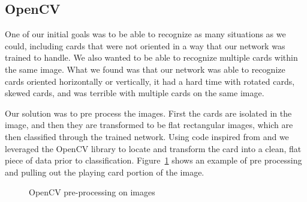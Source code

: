 \documentclass[letterpaper]{article}
\begin{document}
\subsection{OpenCV}
One of our initial goals was to be able to recognize as many situations as we could, including cards that were not oriented in a way that our network was trained to handle.  We also wanted to be able to recognize multiple cards within the same image.  What we found was that our network was able to recognize cards oriented horizontally or vertically, it had a hard time with rotated cards, skewed cards, and was terrible with multiple cards on the same image.

Our solution was to pre process the images.  First the cards are isolated in the image, and then they are transformed to be flat rectangular images, which are then classified through the trained network.  Using code inspired from \cite{openCV1} and \cite{openCV2} we leveraged the OpenCV library to locate and transform the card into a clean, flat piece of data prior to classification.  Figure~\ref{fig:opencv_1} shows an example of pre processing and pulling out the playing card portion of the image.

\begin{figure}
  \centering

  \caption{\label{fig:opencv_1} OpenCV pre-processing on images}
\end{figure}
\end{document}
